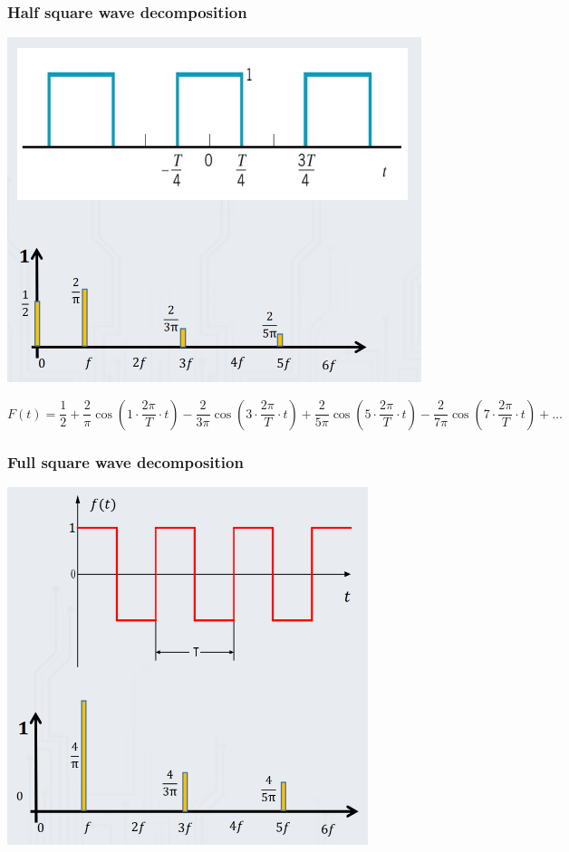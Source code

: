 \documentclass[11pt]{article}
\begin{document}
\subsubsection{Half square wave decomposition}
\label{sec:org6141c01}
\begin{center}
\includegraphics[width=.9\linewidth]{./images/half-square-wave-decomposition.png}
\end{center}

\[F(t) = \frac{1}{2} + \frac{2}{\pi} \cos \left(1 \cdot \frac{2 \pi}{T} \cdot t \right) - \frac{2}{3 \pi} \cos \left( 3 \cdot \frac{2 \pi}{T} \cdot t \right) + \frac{2}{5 \pi} \cos \left( 5 \cdot \frac{2 \pi}{T} \cdot t \right) - \frac{2}{7 \pi} \cos \left( 7 \cdot \frac{2 \pi}{T} \cdot t \right) + \ldots\]
\subsubsection{Full square wave decomposition}
\label{sec:orgee7b4ce}
\begin{center}
\includegraphics[width=.9\linewidth]{./images/full-square-wave-decomposition.png}
\end{center}
\end{document}
